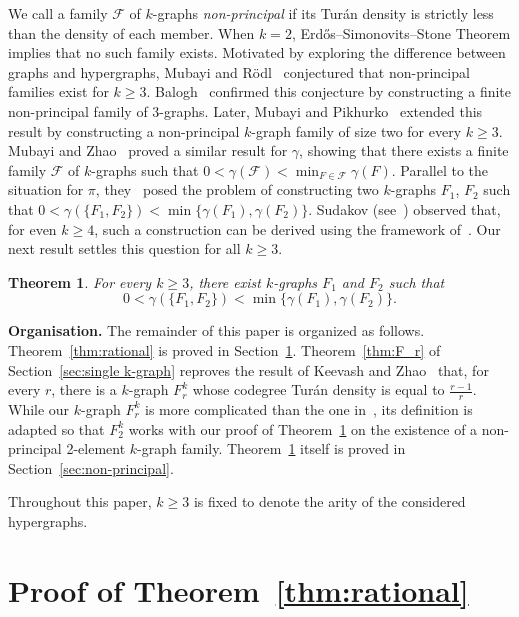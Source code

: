 \documentclass[11pt,a4paper]{article}
\newtheorem{theorem}[definition]{Theorem}
\theoremstyle{remark}
\newcommand{\C}[1]{\mathcal{#1}}
\begin{document}
We call a family $\C F$ of $k$-graphs \emph{non-principal} if its Tur\'an density is strictly less than the density of each member. When $k=2$, Erd\H{o}s--Simonovits--Stone Theorem implies that no such family exists. Motivated by exploring the difference between graphs and hypergraphs, Mubayi and R\"odl~\cite{MR02} conjectured that non-principal families exist for $k\ge 3$. Balogh~\cite{B02} confirmed this conjecture by constructing a finite non-principal family of $3$-graphs. Later, Mubayi and Pikhurko~\cite{MP08} extended this result by constructing a non-principal $k$-graph family of size two for every $k\ge 3$. Mubayi and Zhao~\cite{MZ07} proved a similar result for $\gamma$, showing that there exists a finite family $\C F$ of $k$-graphs such that $0<\gamma(\C F )<\min_{F\in \C F} \gamma(F)$.  Parallel to the situation for $\pi$, they~\cite[Page 1131]{MZ07} posed the problem of constructing two $k$-graphs $F_1$, $F_2$ such
 that $0<\gamma(\{F_1,F_2\})<\min\{\gamma(F_1),\gamma(F_2)\}$. Sudakov (see~\cite[Page 1131]{MZ07}) observed that, for even $k\ge 4$, such a construction can be derived using the framework of~\cite{MP08}. Our next result settles this question for all $k\ge 3$.

 \begin{theorem}\label{thm:non-principal}
  For every $k\ge 3$, there exist $k$-graphs $F_1$ and $F_2$ such that
     \[0<\gamma(\{F_1, F_2\})<\min\{\gamma(F_1),\gamma(F_2)\}.
     \]
 \end{theorem}

\medskip \noindent\textbf{Organisation.} The remainder of this paper is organized as follows.
Theorem~\ref{thm:rational} is proved in Section~\ref{sec:rational}. 
Theorem~\ref{thm:F_r} of Section~\ref{sec:single k-graph} reproves the result of Keevash and Zhao~\cite[Theorem~1.3]{KZ07} that, for every $r$, there is a $k$-graph $F_r^k$ 
whose codegree Tur\'an density is equal to $\frac{r-1}{r}$. While our $k$-graph $F_r^k$ is more complicated than the one in~\cite{KZ07}, its definition is adapted so that $F_2^k$ works with our proof of Theorem~\ref{thm:non-principal} on the existence of a non-principal 2-element $k$-graph family.
Theorem~\ref{thm:non-principal} itself is proved in Section~\ref{sec:non-principal}.

Throughout this paper, $k\ge 3$ is fixed to denote the arity of the considered hypergraphs.
 

 \section{Proof of Theorem~\ref{thm:rational}}\label{sec:rational}
 
\end{document}
